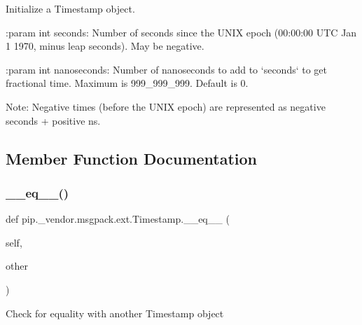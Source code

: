 \begin{DoxyVerb}Initialize a Timestamp object.

:param int seconds:
    Number of seconds since the UNIX epoch (00:00:00 UTC Jan 1 1970, minus leap seconds).
    May be negative.

:param int nanoseconds:
    Number of nanoseconds to add to `seconds` to get fractional time.
    Maximum is 999_999_999.  Default is 0.

Note: Negative times (before the UNIX epoch) are represented as negative seconds + positive ns.
\end{DoxyVerb}
 

\subsection{Member Function Documentation}
\mbox{\label{classpip_1_1__vendor_1_1msgpack_1_1ext_1_1Timestamp_abba6737fdc132514c5817a421e43d60a}} 
\subsubsection{\texorpdfstring{\+\_\+\+\_\+eq\+\_\+\+\_\+()}{\_\_eq\_\_()}}
{\footnotesize\ttfamily def pip.\+\_\+vendor.\+msgpack.\+ext.\+Timestamp.\+\_\+\+\_\+eq\+\_\+\+\_\+ (\begin{DoxyParamCaption}\item[{}]{self,  }\item[{}]{other }\end{DoxyParamCaption})}

\begin{DoxyVerb}Check for equality with another Timestamp object\end{DoxyVerb}
 \mbox{\label{classpip_1_1__vendor_1_1msgpack_1_1ext_1_1Timestamp_a1864c32d746d8b9331118ccc3344952b}} 
